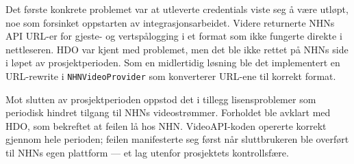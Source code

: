 Det første konkrete problemet var at utleverte credentials viste seg å være utløpt, noe som forsinket oppstarten av integrasjonsarbeidet. Videre returnerte NHNs API URL-er for gjeste- og vertspålogging i et format som ikke fungerte direkte i nettleseren. HDO var kjent med problemet, men det ble ikke rettet på NHNs side i løpet av prosjektperioden. Som en midlertidig løsning ble det implementert en URL-rewrite i \texttt{NHNVideoProvider} som konverterer URL-ene til korrekt format.

Mot slutten av prosjektperioden oppstod det i tillegg lisensproblemer som periodisk hindret tilgang til NHNs videostrømmer. Forholdet ble avklart med HDO, som bekreftet at feilen lå hos NHN. VideoAPI-koden opererte korrekt gjennom hele perioden; feilen manifesterte seg først når sluttbrukeren ble overført til NHNs egen plattform — et lag utenfor prosjektets kontrollsfære.